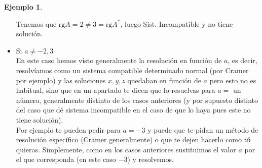 \documentclass[11pt, oneside]{book}
\theoremstyle{definition} %
\newtheorem{ejem}{Ejemplo}
\newcommand{\rg}{\mathrm{rg}}
\begin{document}
\begin{ejem}
\begin{itemize}
	Tenemos que $\rg{A}=2\neq3=\rg{A^*}$, luego Sist. Incompatible y no tiene solución.
	\item Si $a\neq -2,3$\\
	En este caso hemos visto generalmente la resolución en función de $a$, es decir, resolvíamos como un sistema compatible determinado normal (por Cramer por ejemplo) y las soluciones $x,y,z$ quedaban en función de $a$ pero esto no es habitual, sino que en un apartado te dicen que lo resuelvas para $a=$ un número, generalmente distinto de los casos anteriores (y por supuesto distinto del caso que dé sistema incompatible en el caso de que lo haya pues este no tiene solución).\\
	Por ejemplo te pueden pedir para $a=-3$ y puede que te pidan un método de resolución específico (Cramer generalmente) o que te dejen hacerlo como tú quieras. Simplemente, como en los casos anteriores sustituimos el valor $a$ por el que corresponda (en este caso $-3$) y resolvemos.\\
	
\end{itemize}

\end{ejem}
\end{document}
